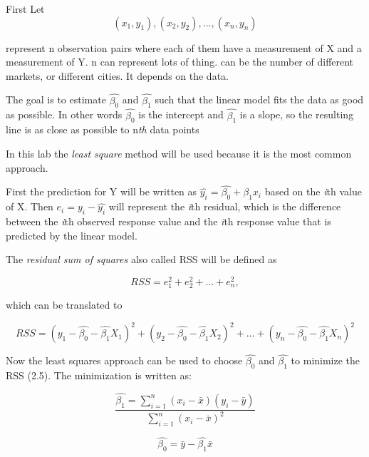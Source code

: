 First Let 
\begin{equation}
(x_1, y_1), (x_2, y_2),..., (x_n, y_n)
\end{equation}

represent n observation pairs where each of them have a measurement of X and a measurement of Y. n can represent lots of thing. can be the number of different markets, or different cities. It depends on the data.

The goal is to estimate $\hat{\beta_0}$ and  $\hat{\beta_1}$ such that the linear model fits the data as good as possible. In other words $\hat{\beta_0}$ is the intercept and  $\hat{\beta_1}$ is a slope, so the resulting line is as close as possible to n\emph{th} data points

In this lab the \emph{least square} method will be used because it is the most common approach. 

First the prediction for Y will be written as $\hat{y_i} = \hat{\beta_0} + \hat{\beta_1} x_i$ based on the \emph{i}th value of X.
Then $e_i = y_i - \hat{y_i}$ will represent the \emph{i}th residual, which is the difference between the \emph{i}th observed response value and the \emph{i}th response value that is predicted by the linear model.

The \emph{residual sum of squares} also called RSS will be defined as

\begin{equation}
RSS = e^2_1 + e^2_2 + ... + e^2_n,
\end{equation}

which can be translated to

\begin{equation}
RSS = (y_1 - \hat{\beta_0} - \hat{\beta_1}X_1)^2 + (y_2 - \hat{\beta_0} - \hat{\beta_1}X_2)^2 + ... + (y_n - \hat{\beta_0} - \hat{\beta_1}X_n)^2
\end{equation}

Now the least squares approach can be used to choose $\hat{\beta_0}$ and $\hat{\beta_1}$ to minimize the RSS (2.5).
The minimization is written as:

\begin{equation}
\dfrac{\hat{\beta_1} = \sum\limits_{i=1}^n(x_i - \bar{x})(y_i - \bar{y})}{\sum\limits_{i=1}^n(x_i - \bar{x})^2}
\end{equation}

\begin{equation}
\hat{\beta_0} = \bar{y} -\hat{\beta_1}\bar{x}
\end{equation}

